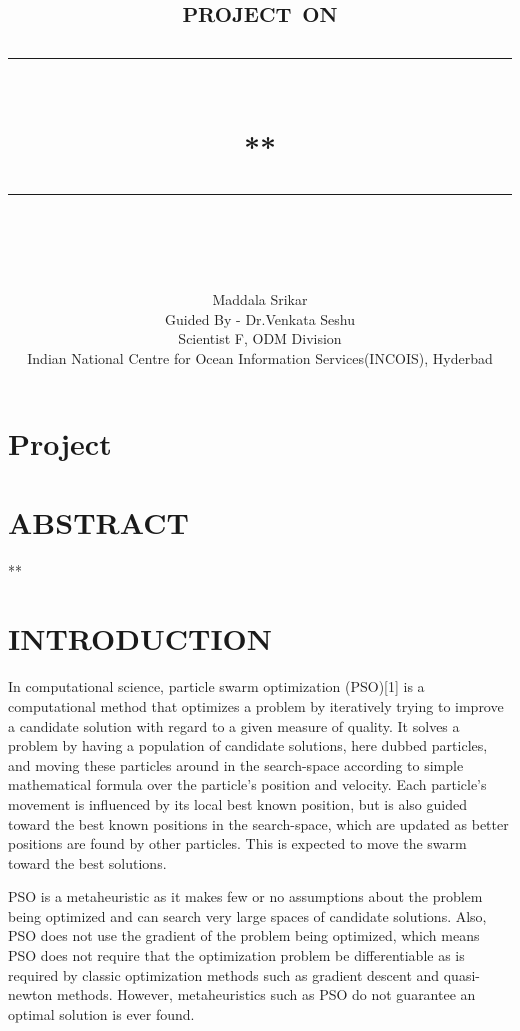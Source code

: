 \documentclass[12pt]{report}
\newcommand{\HRule}[1]{\rule{\linewidth}{#1}}
\begin{document}
\section{Project}

\title{ \normalsize \textsc{project on}
		\\ [2.0cm]
		\HRule{0.5pt} \\
		\LARGE \textbf{\uppercase{**}}
		\HRule{2pt} \\ [0.5cm]
		\normalsize  \vspace*{5\baselineskip}}

\date{}

\author{
		Maddala Srikar  \\
        Guided By - Dr.Venkata Seshu  \\
Scientist F, ODM Division\\
Indian National Centre for Ocean Information Services(INCOIS), Hyderbad\\ }


\section*{ABSTRACT}
**

\section*{INTRODUCTION}

In computational science, particle swarm optimization (PSO)[1] is a computational method that optimizes a problem by iteratively trying to improve a candidate solution with regard to a given measure of quality. It solves a problem by having a population of candidate solutions, here dubbed particles, and moving these particles around in the search-space according to simple mathematical formula over the particle's position and velocity. Each particle's movement is influenced by its local best known position, but is also guided toward the best known positions in the search-space, which are updated as better positions are found by other particles. This is expected to move the swarm toward the best solutions.

PSO is a metaheuristic as it makes few or no assumptions about the problem being optimized and can search very large spaces of candidate solutions. Also, PSO does not use the gradient of the problem being optimized, which means PSO does not require that the optimization problem be differentiable as is required by classic optimization methods such as gradient descent and quasi-newton methods. However, metaheuristics such as PSO do not guarantee an optimal solution is ever found.
\end{document}
